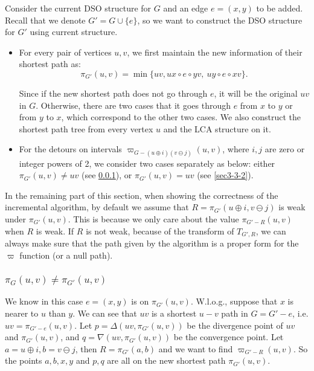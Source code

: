 \documentclass[11pt]{article}
\theoremstyle{plain}
\theoremstyle{definition}
\newcommand{\new}[1]{\pi_{G'}(#1)}
\newcommand{\nng}[3]{\pi_{G'-#3}\left(#1,#2\right)}
\newcommand{\odg}[3]{\varpi_{G-#3}\left(#1,#2\right)}
\newcommand{\ndg}[3]{\varpi_{G'-#3}\left(#1,#2\right)}
\begin{document}
Consider the current DSO structure for $G$ and an edge $e=(x,y)$ to be added. Recall that we denote $G'=G\cup \{ e \}$, so we want to construct the DSO structure for $G'$ using current structure.
\begin{itemize}
\item For every pair of vertices $u,v$, we first maintain the new information of their shortest path as:
          \[\new{u, v}=\min\{uv,ux\circ e\circ yv,~uy\circ e\circ xv\}.\]


          Since if the new shortest path does not go through $e$, it will be the original $uv$ in $G$. Otherwise, there are two cases that it goes through $e$ from $x$ to $y$ or from $y$ to $x$, which correspond to the other two cases. We also construct the shortest path tree from every vertex $u$ and the LCA structure on it.~\cite{BF00}







\item For the detours on intervals $\odg{u}{v}{(u \oplus i)(v \ominus j)}$, where $i,j$ are zero or integer powers of 2, we consider two cases separately as below: either $\new{u, v} \neq uv$ (see \ref{sec3-3-1}), or $\new{u, v} = uv$ (see \ref{sec3-3-2}).
\end{itemize}

In the remaining part of this section, when showing the correctness of the incremental algorithm, by default we assume that $R=\new{u \oplus i,v \ominus j}$ is weak under $\new{u,v}$. This is because we only care about the value $\nng{u}{v}{R}$ when $R$ is weak. If $R$ is not weak, because of the transform of $T_{G',R}$, we can always make sure that the path given by the algorithm is a proper form for the $\varpi$ function (or a null path).

\subsubsection{$\pi_G(u,v)\neq\pi_{G'}(u,v)$}\label{sec3-3-1}

We know in this case $e=(x,y)$ is on $\new{u, v}$. W.l.o.g., suppose that $x$ is nearer to $u$ than $y$. We can see that $uv$ is a shortest $u-v$ path in $G=G'-e$, i.e. $uv=\nng{u}{v}{e}$. Let $p=\Delta(uv,\new{u, v})$ be the divergence point of $uv$ and $\new{u, v}$, and $q=\nabla(uv,\new{u, v})$ be the convergence point. Let $a=u \oplus i, b=v \ominus j$, then $R= \new{a,b}$ and we want to find $\ndg{u}{v}{R}$. So the points $a,b,x,y$ and $p,q$ are all on the new shortest path $\new{u, v}.$  
\end{document}
